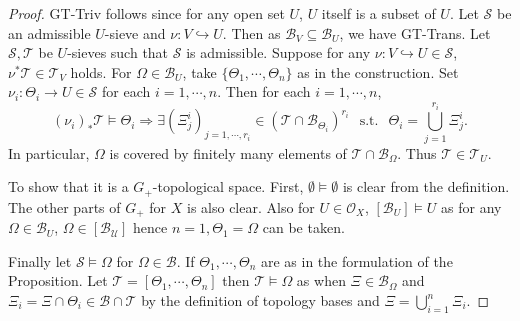 \documentclass[8pt]{article}
\numberwithin{equation}{section}
\DeclareMathOperator{\straw}{s.t.}
\newcommand{\Ouv}{\mathscr{O}}
\newcommand{\U}[0]{\mathcal{U}}
\newcommand{\st}[0]{\:\straw\:}
\newcommand{\sS}[0]{\mathscr{S}}
\newcommand{\sT}[0]{\mathscr{T}}
\newcommand{\cB}[0]{\mathcal{B}}
\begin{document}
\begin{proof}
    GT-Triv follows since for any open set $U$, $U$ itself is a subset of $U$. Let $\sS$ be an admissible $U$-sieve and $\nu:V\hookrightarrow U$. Then as $\mathcal{B}_V\subseteq\mathcal{B}_U$, we have GT-Trans. Let $\mathscr{S},\mathscr{T}$ be $U$-sieves such that $\sS$ is admissible. Suppose for any $\nu:V\hookrightarrow U\in\mathscr{S}$, $\nu^*\mathscr{T}\in\mathcal{T}_V$ holds. 
    For $\Omega\in\cB_U$, take $\{\Theta_1,\cdots,\Theta_n\}$ as in the construction. Set $\nu_i:\Theta_i\to U\in\sS$ for each $i=1,\cdots,n$. Then for each $i=1,\cdots,n$,
    \begin{equation*}
    (\nu_i)_*\sT\vDash \Theta_i\Rightarrow \exists (\Xi^i_j)_{j=1,\cdots,r_i}\in(\sT\cap\cB_{\Theta_i})^{r_i}\:\st\: \Theta_i = \bigcup_{j=1}^{r_i}\Xi_j^i.
    \end{equation*}
    In particular, $\Omega$ is covered by finitely many elements of $\sT\cap\cB_\Omega$. Thus $\mathscr{T}\in\mathcal{T}_U$.
    \par To show that it is a $G_+$-topological space. First, $\emptyset\vDash \emptyset$ is clear from the definition. The other parts of $G_+$ for $X$ is also clear. Also for $U\in\Ouv_X$, $[\cB_U]\vDash U$ as for any $\Omega\in\cB_U$, $\Omega\in[\cB_\U]$ hence $n=1,\Theta_1=\Omega$ can be taken.
    \par Finally let $\sS\vDash \Omega$ for $\Omega\in\mathcal{B}$. If $\Theta_1,\cdots,\Theta_n$ are as in the formulation of the Proposition. Let $\mathscr{T} = [\Theta_1,\cdots,\Theta_n]$ then $\mathscr{T}\vDash \Omega$ as when $\Xi\in\cB_\Omega$ and $\Xi_i = \Xi\cap \Theta_i\in\cB\cap \mathscr{T}$ by the definition of topology bases and $\Xi=\bigcup_{i=1}^n\Xi_i$. %
\end{proof}
\end{document}
